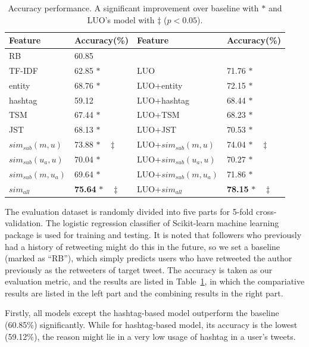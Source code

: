 \documentclass{acm_proc_article-sp}
\begin{document}
\begin{table}[htb]
\scriptsize
\centering
\caption{Accuracy performance. A significant improvement over baseline with $ \ast $ and LUO's model with $ \ddagger $ ($p < 0.05$).}
\label{tab3}
\begin{tabular}{|l|l|l|l|}
\hline
Feature & Accuracy(\%) & Feature & Accuracy(\%)\\
\hline
RB & 60.85 & & \\
\hline
TF-IDF & 62.85   $\ast$ & LUO & 71.76 $ \ast  $\\
entity & 68.76  $\ast$ & LUO+entity & 72.15 $\ast$\\
hashtag & 59.12  & LUO+hashtag & 68.44 $\ast$\\
\hline
TSM & 67.44 $\ast$ & LUO+TSM & 68.23 $\ast$\\
JST & 68.13 $\ast$ & LUO+JST & 70.53 $\ast$\\
\hline
$ sim_{sub} \left( m,u \right) $ & 73.88   $\ast  \quad \ddagger $ &LUO+$ sim_{sub} \left( m,u \right)$ & 74.04  $ \ast \quad \ddagger $\\
$ sim_{sub}\left( u_{a},u \right)  $ & 70.04   $\ast  $ & LUO+$ sim_{sub}\left( u_{a},u \right)$ & 70.27  $ \ast $\\
$ sim_{sub}\left( m,u_{a} \right)  $ & 69.64   $\ast  $ & LUO+$ sim_{sub}\left( m,u_{a} \right)$ & 71.86  $ \ast $\\
$ sim_{all}  $ & \textbf{75.64}   $\ast \quad \ddagger $ & LUO+$ sim_{all}  $ & \textbf{78.15}  $ \ast \quad \ddagger $\\
\hline
\end{tabular}
\end{table}

The evaluation dataset is randomly divided into five parts for 5-fold cross-validation. 
The logistic regression classifier of Scikit-learn machine learning package \cite{scikit-learn} is used for training and testing.
It is noted that followers who previously had a history of retweeting might do this in the future, so we set a baseline (marked as ``RB''), which simply predicts users who have retweeted the author previously as the retweeters of target tweet. 
The accuracy is taken as our evaluation metric, and the results are listed in Table~\ref{tab3}, in which the compariative results are listed in the left part and the combining results in the right part.

Firstly, all models except the hashtag-based model outperform the baseline (60.85\%) significantly. While for hashtag-based model, its accuracy is the lowest (59.12\%), the reason might lie in a very low usage of hashtag in a user's tweets. 
\end{document}
